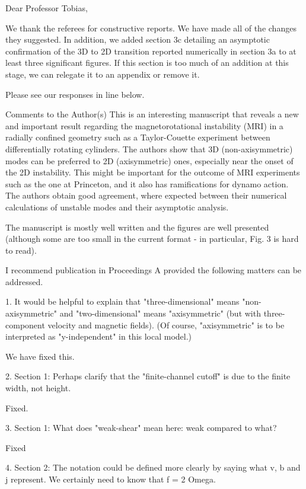 \documentclass[letterpaper, 12pt]{article}
\newenvironment{review}{\vspace{1em}\begin{leftbar}}{\end{leftbar}}
\begin{document}
Dear Professor Tobias,

We thank the referees for constructive reports. We have made all of the changes they suggested. In addition, we added section 3c detailing an asymptotic confirmation of the 3D to 2D transition reported numerically in section 3a to at least three significant figures. If this section is too much of an addition at this stage, we can relegate it to an appendix or remove it.

Please see our responses in line below.

\begin{review}
Comments to the Author(s)
This is an interesting manuscript that reveals a new and important result regarding the magnetorotational instability (MRI) in a radially confined geometry such as a Taylor-Couette experiment between differentially rotating cylinders. The authors show that 3D (non-axisymmetric) modes can be preferred to 2D (axisymmetric) ones, especially near the onset of the 2D instability. This might be important for the outcome of MRI experiments such as the one at Princeton, and it also has ramifications for dynamo action. The authors obtain good agreement, where expected between their numerical calculations of unstable modes and their asymptotic analysis.

The manuscript is mostly well written and the figures are well presented (although some are too small in the current format - in particular, Fig. 3 is hard to read).

I recommend publication in Proceedings A provided the following matters can be addressed.

1. It would be helpful to explain that "three-dimensional" means "non-axisymmetric" and "two-dimensional" means "axisymmetric" (but with three-component velocity and magnetic fields). (Of course, "axisymmetric" is to be interpreted as "y-independent" in this local model.)
\end{review}
We have fixed this.

\begin{review}  
2. Section 1: Perhaps clarify that the "finite-channel cutoff" is due to the finite width, not height.
\end{review}
Fixed.

\begin{review}
3. Section 1: What does "weak-shear" mean here: weak compared to what?  
\end{review}

Fixed

\begin{review}
4. Section 2: The notation could be defined more clearly by saying what v, b and j represent. We certainly need to know that f = 2 Omega.
\end{review}
\end{document}
